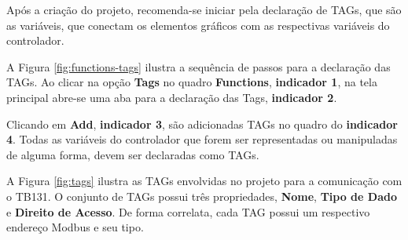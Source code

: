 Após a criação do projeto, 
recomenda-se iniciar pela declaração de TAGs, 
que são as variáveis, que conectam os elementos gráficos com as respectivas variáveis do controlador. 

A Figura \ref{fig:functions-tags} 
ilustra a sequência de passos para a declaração das TAGs. 
Ao clicar na opção \textbf{Tags} 
no quadro \textbf{Functions}, 
\textbf{indicador 1}, 
na tela principal abre-se uma aba para a declaração das Tags, 
\textbf{indicador 2}.



\begin{figure}[ht!]
	\centering
\end{figure}



Clicando em \textbf{Add}, \textbf{indicador 3}, 
são adicionadas TAGs no quadro do \textbf{indicador 4}. 
Todas as variáveis do controlador que forem ser representadas ou manipuladas de alguma forma, devem ser declaradas como TAGs. 


A Figura \ref{fig:tags} 
ilustra as TAGs envolvidas no projeto para a comunicação com o TB131. 
O conjunto de TAGs possui três propriedades, 
\textbf{Nome}, \textbf{Tipo de Dado} e \textbf{Direito de Acesso}.
De forma correlata, 
cada TAG possui um respectivo endereço Modbus e seu tipo. 



\begin{figure}[ht!]
	\centering
\end{figure}



